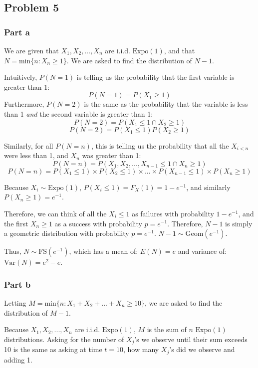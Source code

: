 \documentclass{article}
\begin{document}
\subsection{Problem 5}
\subsubsection{Part a}
We are given that $X_{1}, X_{2}, ... ,X_{n}$ are i.i.d. $\text{Expo}(1)$, and that $N = \text{min}\{n:X_{n} \geq 1\}$. We are asked to find the distribution of $N - 1$.

Intuitively, $P(N = 1)$ is telling us the probability that the first variable is greater than 1:
$$P(N = 1) = P(X_{1} \geq 1)$$
Furthermore, $P(N = 2)$ is the same as the probability that the variable is less than 1 \textit{and} the second variable is greater than 1:
$$P(N = 2) = P(X_{1} \leq 1 \cap X_{2} \geq 1)$$
$$P(N = 2) = P(X_{1} \leq 1) P(X_{2} \geq 1)$$

Similarly, for all $P(N = n)$, this is telling us the probability that all the $X_{i < n}$ were less than 1, and $X_{n}$ was greater than 1:
$$P(N = n) = P(X_{1}, X_{2}, ..., X_{n - 1} \leq 1 \cap X_{n} \geq 1)$$
$$P(N = n) = P(X_{1} \leq 1) \times P(X_{2} \leq 1) \times ... \times P(X_{n - 1} \leq 1) \times P(X_{n} \geq 1)$$

Because $X_{i} \sim \text{Expo}(1)$, $P(X_{i} \leq 1) = F_{X}(1) = 1 - e^{-1}$, and similarly $P(X_{n} \geq 1) = e^{-1}$. 

Therefore, we can think of all the $X_{i} \leq 1$ as failures with probability $1 - e^{-1}$, and the first $X_{n} \geq 1$ as a success with probability $p = e^{-1}$. Therefore, $N - 1$ is simply a geometric distribution with probability $p = e^{-1}$. $N - 1 \sim \text{Geom}(e^{-1})$.

Thus, $N \sim \text{FS}(e^{-1})$, which has a mean of: $E(N) = e$ and variance of: $\text{Var}(N) = e^{2} - e$.

\subsubsection{Part b}
Letting $M = \text{min}\{n:X_{1} + X_{2} + ... + X_{n} \geq 10\}$, we are asked to find the distribution of $M - 1$.

Because $X_{1}, X_{2}, ... ,X_{n}$ are i.i.d. $\text{Expo}(1)$, $M$ is the sum of $n$ $\text{Expo}(1)$ distributions. Asking for the number of $X_{j}$'s we observe until their sum exceeds 10 is the same as asking at time $t = 10$, how many $X_{j}$'s did we observe and adding 1.
\end{document}
